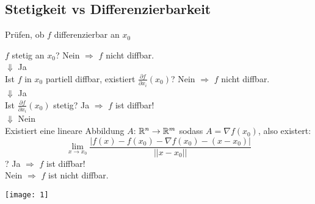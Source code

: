 \subsection{Stetigkeit vs Differenzierbarkeit}


\begin{Rezept}{Prüfen, ob $f$ differenzierbar an $x_0$}{}
	\begin{minipage}{.6\textwidth}
		$f$ stetig an $x_0$? Nein $\Rightarrow$ $f$ nicht diffbar.\\
		$\Downarrow$ Ja\\
		Ist $f$ in $x_0$ partiell diffbar, existiert $\frac{\partial f}{\partial x_i}(x_0)$? Nein $\Rightarrow$ $f$ nicht diffbar.\\
		$\Downarrow$ Ja\\
		Ist $\frac{\partial f}{\partial x_i}(x_0)$ stetig? Ja $\Rightarrow$ $f$ ist diffbar!\\
		$\Downarrow$ Nein\\
		Existiert eine lineare Abbildung $A$: $\mathbb{R}^n \rightarrow \mathbb{R}^m$ sodass $A=\nabla f(x_0)$, also existert:
		\[
    		\lim_{x\rightarrow x_0} \frac{|f(x)-f(x_0)-\nabla f(x_0) - (x-x_0)|}{||x-x_0||}
		\]?
		Ja $\Rightarrow$ $f$ ist diffbar!\\
		Nein $\Rightarrow$ $f$ ist nicht diffbar.
	\end{minipage}	
	\begin{minipage}{.4\textwidth}
		\texttt{[image: 1]}
	\end{minipage}        
\end{Rezept}
